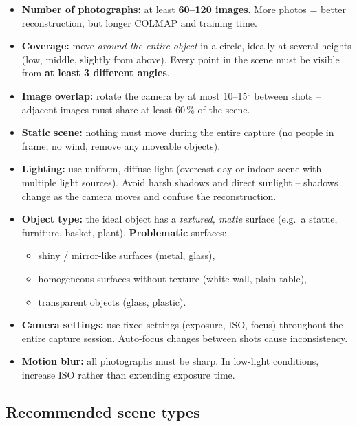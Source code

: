 \documentclass{article}
\begin{document}
\begin{itemize}
    \item \textbf{Number of photographs:} at least \textbf{60--120 images}.
          More photos = better reconstruction, but longer COLMAP and training time.
    \item \textbf{Coverage:} move \emph{around the entire object} in a circle,
          ideally at several heights (low, middle, slightly from above).
          Every point in the scene must be visible from \textbf{at least 3 different angles}.
    \item \textbf{Image overlap:} rotate the camera by at most 10--15° between shots --
          adjacent images must share at least 60\,\% of the scene.
    \item \textbf{Static scene:} nothing must move during the entire capture
          (no people in frame, no wind, remove any moveable objects).
    \item \textbf{Lighting:} use uniform, diffuse light (overcast day or
          indoor scene with multiple light sources).
          Avoid harsh shadows and direct sunlight -- shadows change as the
          camera moves and confuse the reconstruction.
    \item \textbf{Object type:} the ideal object has a \emph{textured, matte}
          surface (e.g.\ a statue, furniture, basket, plant).
          \textbf{Problematic} surfaces:
          \begin{itemize}
              \item shiny / mirror-like surfaces (metal, glass),
              \item homogeneous surfaces without texture (white wall, plain table),
              \item transparent objects (glass, plastic).
          \end{itemize}
    \item \textbf{Camera settings:} use fixed settings (exposure, ISO, focus)
          throughout the entire capture session.
          Auto-focus changes between shots cause inconsistency.
    \item \textbf{Motion blur:} all photographs must be sharp.
          In low-light conditions, increase ISO rather than extending exposure time.
\end{itemize}

\subsection*{Recommended scene types}
\end{document}
